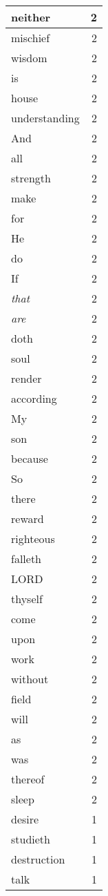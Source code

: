 \begin{center}
\begin{longtable}{l|r}
neither & 2\\ \hline 
mischief & 2\\ \hline 
wisdom & 2\\ \hline 
is & 2\\ \hline 
house & 2\\ \hline 
understanding & 2\\ \hline 
And & 2\\ \hline 
all & 2\\ \hline 
strength & 2\\ \hline 
make & 2\\ \hline 
for & 2\\ \hline 
He & 2\\ \hline 
do & 2\\ \hline 
If & 2\\ \hline 
\emph{that} & 2\\ \hline 
\emph{are} & 2\\ \hline 
doth & 2\\ \hline 
soul & 2\\ \hline 
render & 2\\ \hline 
according & 2\\ \hline 
My & 2\\ \hline 
son & 2\\ \hline 
because & 2\\ \hline 
So & 2\\ \hline 
there & 2\\ \hline 
reward & 2\\ \hline 
righteous & 2\\ \hline 
falleth & 2\\ \hline 
LORD & 2\\ \hline 
thyself & 2\\ \hline 
come & 2\\ \hline 
upon & 2\\ \hline 
work & 2\\ \hline 
without & 2\\ \hline 
field & 2\\ \hline 
will & 2\\ \hline 
as & 2\\ \hline 
was & 2\\ \hline 
thereof & 2\\ \hline 
sleep & 2\\ \hline 
desire & 1\\ \hline 
studieth & 1\\ \hline 
destruction & 1\\ \hline 
talk & 1\\ \hline 

\end{longtable}
\end{center}
